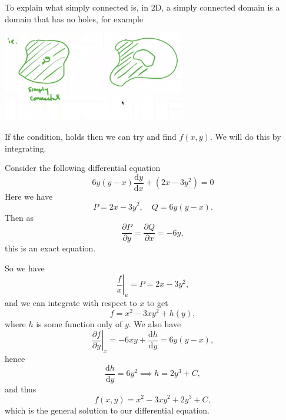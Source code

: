 \documentclass[a4paper]{scrreprt}
\newcommand{\dd}{\mathrm{d}}
\begin{document}
To explain what simply connected is, in 2D, a simply connected domain is a domain that has no holes, for example 
\begin{center}
	\includegraphics[width=0.6\textwidth]{simply-connected.png}
\end{center}

If the condition, holds then we can try and find $f(x, y)$. We will do this by integrating.

\begin{example}
	Consider the following differential equation
	$$
	6y(y - x)\frac{\dd y}{\dd x} + (2x - 3y^2) = 0
	$$
	Here we have
	$$
	P = 2x - 3y^2, \quad Q = 6y(y - x).
	$$
	Then as
	$$
	\frac{\partial P}{\partial y} = \frac{\partial Q}{\partial x} = -6y,
	$$
	this is an exact equation.

	So we have
	$$
	\left.\frac{f}{x}\right|_{u} = P = 2x - 3y^2,
	$$
	and we can integrate with respect to $x$ to get
	$$
f= x^2 - 3xy^2 + h(y),
	$$
	where $h$ is some function only of $y$.
	We also have
	$$
	\left.\frac{\partial f}{\partial y}\right|_x = -6xy + \frac{\dd h}{\dd y} = 6y(y - x),
	$$
	hence
	$$
	\frac{\dd h}{\dd y} = 6y^2 \implies h = 2y^3 + C,
	$$
	and thus
	$$
	f(x, y) = x^2 - 3xy^2 + 2y^3 + C,
	$$
	which is the general solution to our differential equation.
\end{example}
\end{document}

